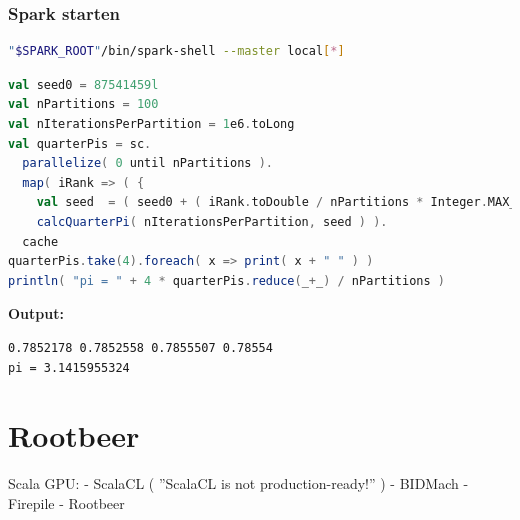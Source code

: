 \begin{frame}[fragile]
    \frametitle{Spark starten}
    \begin{lstlisting}[language=bash]
"$SPARK_ROOT"/bin/spark-shell --master local[*]
\end{lstlisting}\vspace{-1.5\baselineskip}
    \begin{lstlisting}[language=scala]
val seed0 = 87541459l
val nPartitions = 100
val nIterationsPerPartition = 1e6.toLong
val quarterPis = sc.
  parallelize( 0 until nPartitions ).
  map( iRank => ( {
    val seed  = ( seed0 + ( iRank.toDouble / nPartitions * Integer.MAX_VALUE ).toLong ) % Integer.MAX_VALUE
    calcQuarterPi( nIterationsPerPartition, seed ) ).
  cache
quarterPis.take(4).foreach( x => print( x + " " ) )
println( "pi = " + 4 * quarterPis.reduce(_+_) / nPartitions )
\end{lstlisting}\vspace{-1.5\baselineskip}
    \textbf{Output:}
    \begin{lstlisting}
0.7852178 0.7852558 0.7855507 0.78554
pi = 3.1415955324
\end{lstlisting}\vspace{-1.5\baselineskip}
\end{frame}



\section{Rootbeer}


\begin{frame}
Scala GPU:
  - ScalaCL ( ''ScalaCL is not production-ready!'' )
  - BIDMach
  - Firepile
  - Rootbeer
\end{frame}

